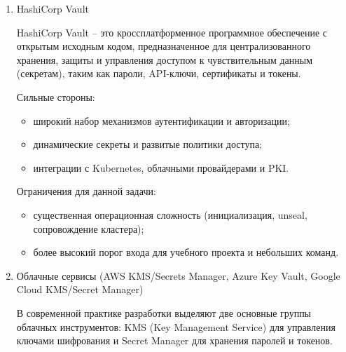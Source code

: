 \documentclass[14pt, a4paper]{extarticle}
\begin{document}
	\begin{enumerate}                                        

	\item HashiCorp Vault
	
	HashiCorp Vault -- это кроссплатформенное программное обеспечение с открытым исходным кодом, предназначенное для централизованного хранения, защиты и управления доступом к чувствительным данным (секретам), таким как пароли, API-ключи, сертификаты и токены.
	
	Сильные стороны:
	
	\begin{itemize}
	\item широкий набор механизмов аутентификации и авторизации;
	\item динамические секреты и развитые политики доступа;
	\item интеграции с Kubernetes, облачными провайдерами и PKI.
	\end{itemize}
	
	Ограничения для данной задачи:
	
	\begin{itemize}
	\item существенная операционная сложность (инициализация, unseal, сопровождение кластера);
	\item более высокий порог входа для учебного проекта и небольших команд.
	\end{itemize}
		
	\item Облачные сервисы (AWS KMS/Secrets Manager, Azure Key Vault, Google Cloud KMS/Secret Manager)
	
	В современной практике разработки выделяют две основные группы облачных инструментов: KMS (Key Management Service) для управления ключами шифрования и Secret Manager для хранения паролей и токенов.
	

\end{enumerate}
\end{document}
